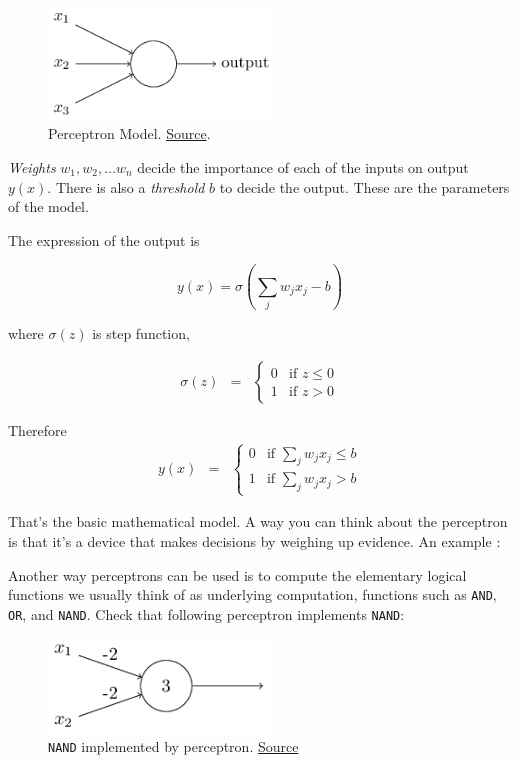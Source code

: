 \documentclass[a4paper]{tufte-handout}
\begin{document}
\begin{figure}
  \includegraphics[width=60mm]{tikz0}
  \caption{ Perceptron Model.
\href{http://neuralnetworksanddeeplearning.com/chap1.html}{Source}. }
\end{figure}


\emph{Weights} \(w_1, w_2, \ldots w_n\) decide the importance of each of
the inputs on output \(y(x)\). There is also a \emph{threshold} \(b\) to
decide the output. These are the parameters of the model.

The expression of the output is

\[ y(x) = \sigma\left(\sum_j w_j x_j - b\right) \]

where \(\sigma(z)\) is step function, 

\begin{eqnarray*}
  \sigma(z) & = & \left\{ \begin{array}{ll}
      0 & \mbox{if } z \leq 0 \\
      1 & \mbox{if } z > 0
      \end{array} \right.
\end{eqnarray*}

Therefore 
\begin{eqnarray*}
    y(x) & = & \left\{ \begin{array}{ll}
      0 & \mbox{if } \sum_j w_j x_j \leq b \\
      1 & \mbox{if } \sum_j w_j x_j > b
      \end{array} \right.
\end{eqnarray*}

That's the basic mathematical model. A way you can think about the
perceptron is that it's a device that makes decisions by weighing up
evidence. An example
:

Another way perceptrons can be used is to compute the elementary logical
functions we usually think of as underlying computation, functions such
as \texttt{AND}, \texttt{OR}, and \texttt{NAND}. Check that following
perceptron implements \texttt{NAND}:

\begin{figure}
  \includegraphics[width=60mm]{tikz2}
  \caption{\texttt{NAND} implemented by perceptron.
\href{http://neuralnetworksanddeeplearning.com/chap1.html}{Source} }
\end{figure}
\end{document}
